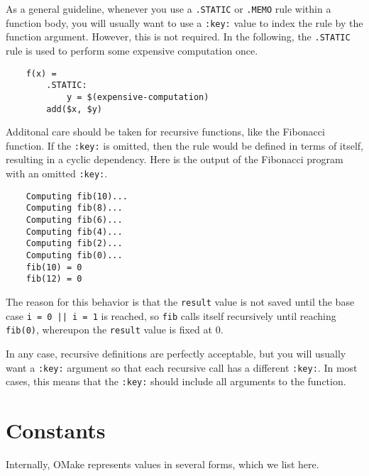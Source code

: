 As a general guideline, whenever you use a \verb+.STATIC+ or \verb+.MEMO+ rule within a function
body, you will usually want to use a \verb+:key:+ value to index the rule by the function argument.
However, this is not required.  In the following, the \verb+.STATIC+ rule is used to perform some
expensive computation once.

\begin{verbatim}
    f(x) =
        .STATIC:
            y = $(expensive-computation)
        add($x, $y)
\end{verbatim}

Additonal care should be taken for recursive functions, like the Fibonacci function.  If the
\verb+:key:+ is omitted, then the rule would be defined in terms of itself, resulting in a cyclic
dependency.  Here is the output of the Fibonacci program with an omitted \verb+:key:+.

\begin{verbatim}
    Computing fib(10)...
    Computing fib(8)...
    Computing fib(6)...
    Computing fib(4)...
    Computing fib(2)...
    Computing fib(0)...
    fib(10) = 0
    fib(12) = 0
\end{verbatim}
%
The reason for this behavior is that the \verb+result+ value is not saved until the base case
\verb+i = 0 || i = 1+ is reached, so \verb+fib+ calls itself recursively until reaching
\verb+fib(0)+, whereupon the \verb+result+ value is fixed at 0.

In any case, recursive definitions are perfectly acceptable, but you will usually want a
\verb+:key:+ argument so that each recursive call has a different \verb+:key:+.  In most cases, this
means that the \verb+:key:+ should include all arguments to the function.

\section{Constants}

Internally, OMake represents values in several forms, which we list here.

